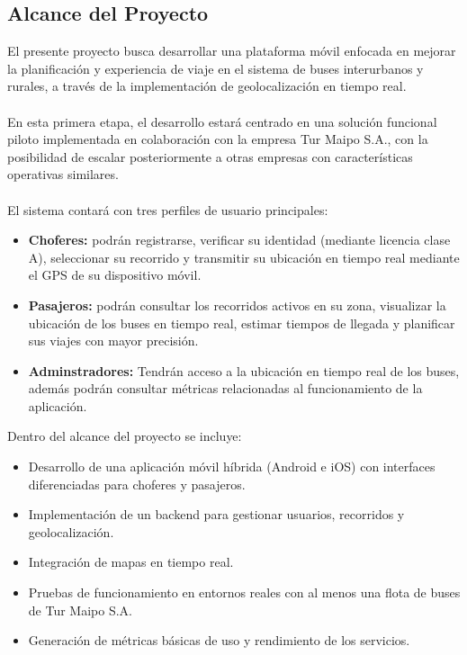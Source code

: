 \documentclass[12pt]{article}
\begin{document}
\subsection{Alcance del Proyecto}
El presente proyecto busca desarrollar una plataforma móvil enfocada en mejorar la planificación y experiencia de viaje en el sistema de buses interurbanos y rurales, a través de la implementación de geolocalización en tiempo real.
\\\\
En esta primera etapa, el desarrollo estará centrado en una solución funcional piloto implementada en colaboración con la empresa Tur Maipo S.A., con la posibilidad de escalar posteriormente a otras empresas con características operativas similares.
\\\\
El sistema contará con tres perfiles de usuario principales:
\begin{itemize}
    \item \textbf{Choferes:} podrán registrarse, verificar su identidad (mediante licencia clase A), seleccionar su recorrido y transmitir su ubicación en tiempo real mediante el GPS de su dispositivo móvil.

    \item \textbf{Pasajeros:} podrán consultar los recorridos activos en su zona, visualizar la ubicación de los buses en tiempo real, estimar tiempos de llegada y planificar sus viajes con mayor precisión.
    \item  \textbf{Adminstradores: } Tendrán acceso a la ubicación en tiempo real de los buses, además podrán consultar métricas relacionadas al funcionamiento de la aplicación.
\end{itemize}
Dentro del alcance del proyecto se incluye:
\begin{itemize}
    \item Desarrollo de una aplicación móvil híbrida (Android e iOS) con interfaces diferenciadas para choferes y pasajeros.

    \item Implementación de un backend para gestionar usuarios, recorridos y geolocalización.

    \item Integración de mapas en tiempo real.

    \item Pruebas de funcionamiento en entornos reales con al menos una flota de buses de Tur Maipo S.A.

    \item Generación de métricas básicas de uso y rendimiento de los servicios.
\end{itemize}
\end{document}
